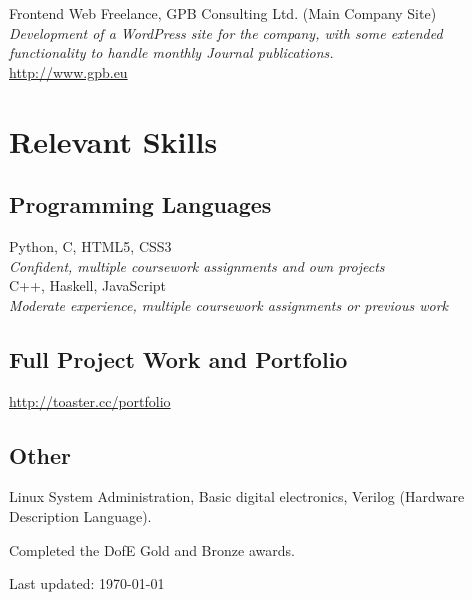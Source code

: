 \documentclass[10pt, a4paper]{article}
\newcommand{\years}[1]{\marginnote{\scriptsize #1}}
\begin{document}
\years{2011-2012} Frontend Web Freelance, GPB Consulting Ltd. (Main Company Site) \\
\emph{Development of a WordPress site for the company, with some extended functionality to handle 
  monthly Journal publications.}\\
\href{http://www.gpb.eu}{http://www.gpb.eu}

\section*{Relevant Skills}

\subsection*{Programming Languages}

Python, C, HTML5, CSS3 \\
\emph{Confident, multiple coursework assignments and own projects}\\
C++, Haskell, JavaScript\\
\emph{Moderate experience, multiple coursework assignments or previous work}


\subsection*{Full Project Work and Portfolio}

\href{http://toaster.cc/portfolio}{http://toaster.cc/portfolio}

\subsection*{Other}

Linux System Administration, Basic digital electronics, Verilog (Hardware Description Language).


Completed the DofE Gold and Bronze awards.

\vfill{}

\begin{center}
  {
    \scriptsize  Last updated: \today%
  }
\end{center}
\end{document}
